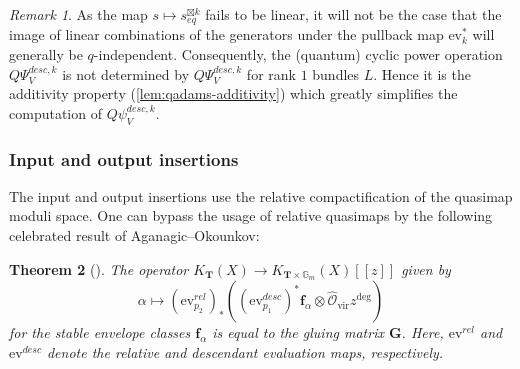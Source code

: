 \documentclass[reqno]{amsart}
\numberwithin{equation}{section}
\numberwithin{equation}{section}
\numberwithin{equation}{section}
\newtheorem{thm}{Theorem}[section]
\theoremstyle{definition}
\theoremstyle{remark}
\theoremstyle{remark}
\newtheorem{rem}[thm]{Remark}
\begin{document}
\begin{rem}
    As the map $s \mapsto s_{eq}^{\boxtimes k}$ fails to be linear, it will not be the case that the image of linear combinations of the generators under the pullback map $\mathrm{ev}_k^*$ will generally be $q$-independent. Consequently, the (quantum) cyclic power operation $Q\Psi^{desc, k}_{V}$ is not determined by $Q\Psi^{desc,k}_V$ for rank $1$ bundles $L$. Hence it is the additivity property (\cref{lem:qadams-additivity}) which greatly simplifies the computation of $Q\psi^{desc,k}_V$.
\end{rem}





\subsubsection{Input and output insertions}

The input and output insertions use the relative compactification of the quasimap moduli space. One can bypass the usage of relative quasimaps by the following celebrated result of Aganagic--Okounkov:

\begin{thm}[{\cite[Theorem 1]{aganagic-okounkov-bethe}}]
    The operator $K_{\mathbf{T}}(X) \to K_{\mathbf{T} \times \mathbb{G}_m}(X)[\![z]\!]$ given by
    \begin{equation}
        \alpha \mapsto (\mathrm{ev}_{p_2}^{rel})_* \left( (\mathrm{ev}_{p_1}^{desc})^* \mathbf{f}_\alpha \otimes \hat{\mathcal{O}}_{\mathrm{vir}} z^{\deg} \right) 
    \end{equation}
    for the \emph{stable envelope classes} $\mathbf{f}_\alpha$ is equal to the gluing matrix $\mathbf{G}$. Here, $\mathrm{ev}^{rel}$ and $\mathrm{ev}^{desc}$ denote the relative and descendant evaluation maps, respectively.
\end{thm}
\end{document}
